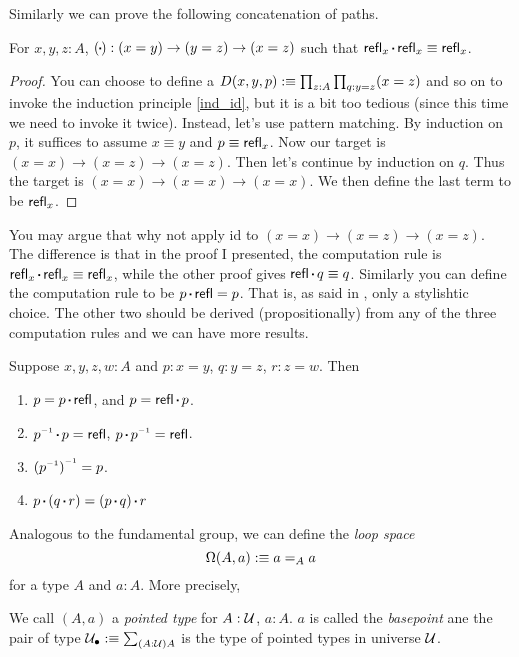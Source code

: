 \newcommand{\sqcdot}{\mathbin{\vcenter{\hbox{\rule{.3ex}{.3ex}}}}}
\newcommand{\concat}{\sqcdot}
Similarly we can prove the following concatenation of paths.  
\begin{lemma}
    For $x,y,z: A$, $(\concat):(x=y)\to(y=z)\to(x=z)$ such that
    $\refl_x\concat \refl_x\equiv\refl_x$. 
\end{lemma}
\begin{proof}
    You can choose to define a $D(x,y,p):\equiv\prod_{z:A}\prod_{q:y=z}(x=z)$
    and so on to invoke the induction principle \eqref{ind_id}, but it is
    a bit too tedious (since this time we need to invoke it twice).
    Instead, let's use pattern matching. By induction on $p$, it suffices 
    to assume $x\equiv y$ and $p\equiv\text{\sf refl}_x$. Now our target is
    $(x=x)\to(x=z)\to(x=z)$. Then let's continue by induction on $q$.
    Thus the target is $(x=x)\to(x=x)\to(x=x)$. We then define the last
    term to be $\text{\sf refl}_x$. 
\end{proof}
You may argue that why not apply id to $(x=x)\to(x=z)\to(x=z)$. The 
difference is that in the proof I presented, the computation rule is 
$\refl_x\concat\refl_x\equiv\refl_x$, while the other proof gives 
$\refl\concat q\equiv q$. Similarly you can define the computation
rule to be $p\concat\refl=p$. That is, as said in 
\cite{homotopy-type-theory}, only a stylishtic choice. The other two
should be derived (propositionally) from any of the three computation 
rules and we can have more results.
\begin{lemma}
    Suppose $x,y,z,w:A$ and $p:x=y$, $q:y=z$, $r:z=w$. Then
    \begin{enumerate}
        \item $p=p\concat\refl$, and $p=\refl\concat p$.
        \item $p\inv\concat p=\refl$, $p\concat p\inv=\refl$.
        \item ${(p\inv)}\inv=p$.
        \item $p\concat(q\concat r) = (p\concat q)\concat r$
    \end{enumerate}
\end{lemma}

Analogous to the fundamental group, we can define the {\it loop space} 
$$\Omega(A, a):\equiv a=_Aa$$ for a type $A$ and $a: A$. More precisely,

\newcommand{\pointed}{_\bullet}
\begin{definition}
    We call $(A, a)$ a {\it pointed type} for $A:\mathcal{U}$, $a:A$.
    $a$ is called the {\it basepoint} ane the pair of type 
    $\universe\pointed\defn\sum_{(A:\universe)A}$ is the type of pointed 
    types in universe $\mathcal{U}$.
\end{definition}

